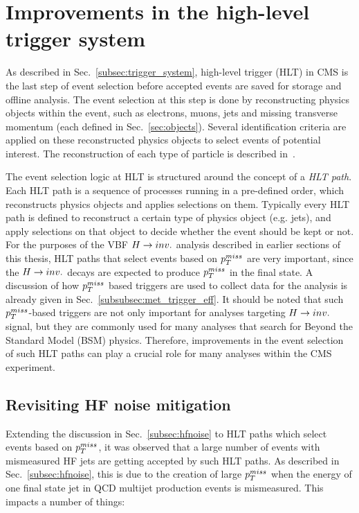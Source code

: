 \section{Improvements in the high-level trigger system}

\graphicspath{{5_Outlook/Figures}}

As described in Sec.~\ref{subsec:trigger_system}, high-level trigger (HLT) in CMS is the last step of event selection before accepted events are saved for storage
and offline analysis.
The event selection at this step is done by reconstructing physics objects within the event, such as electrons, muons, jets 
and missing transverse momentum (each defined in Sec.~\ref{sec:objects}).
Several identification criteria are applied on these reconstructed physics objects to select events of potential interest. The reconstruction of each
type of particle is described in~\cite{cms:hlt_paper}.

The event selection logic at HLT is structured around the concept of a \textit{HLT path}. Each HLT path is a sequence of processes running in a pre-defined order, which
reconstructs physics objects and applies selections on them. Typically every HLT path is defined to reconstruct a certain type of physics object (e.g. jets), and apply
selections on that object to decide whether the event should be kept or not. For the purposes of the VBF $H \rightarrow inv.$ analysis described in earlier sections of this thesis,
HLT paths that select events based on $p_T^{miss}$ are very important, since the $H \rightarrow inv.$ decays are expected to produce $p_T^{miss}$ in the final state. A discussion of how
$p_T^{miss}$ based triggers are used to collect data for the analysis is already given in Sec.~\ref{subsubsec:met_trigger_eff}. It should be noted that such $p_T^{miss}$-based triggers
are not only important for analyses targeting $H \rightarrow inv.$ signal, but they are commonly used for many analyses that search for Beyond the Standard Model (BSM) physics. Therefore,
improvements in the event selection of such HLT paths can play a crucial role for many analyses within the CMS experiment.

\subsection{Revisiting HF noise mitigation}
\label{subsec:hf_noise_hlt}

Extending the discussion in Sec.~\ref{subsec:hfnoise} to HLT paths which select events based on $p_T^{miss}$, 
it was observed that a large number of events with mismeasured HF jets are getting accepted by such HLT paths. 
As described in Sec.~\ref{subsec:hfnoise}, this is due to the creation of large $p_T^{miss}$ when the energy of one final state jet in QCD multijet
production events is mismeasured. This impacts a number of things:

